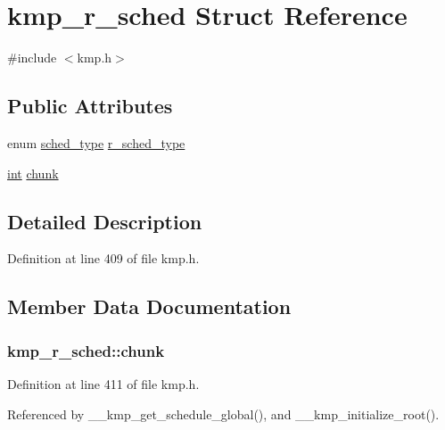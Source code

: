 \hypertarget{structkmp__r__sched}{\section{kmp\-\_\-r\-\_\-sched Struct Reference}
\label{structkmp__r__sched}
}


{\ttfamily \#include $<$kmp.\-h$>$}

\subsection*{Public Attributes}
\begin{DoxyCompactItemize}
\item 
enum \hyperlink{group__WORK__SHARING_gadcaf200537aaa0218a60c398438f81be}{sched\-\_\-type} \hyperlink{structkmp__r__sched_adc5935f3b0a5ef40ba9b9a019f815fc1}{r\-\_\-sched\-\_\-type}
\item 
\hyperlink{ittnotify__static_8h_a8b8dcd723308a8cb5d84277c7a3fff70}{int} \hyperlink{structkmp__r__sched_a22eae9ec8051de2d700b8991f33dead5}{chunk}
\end{DoxyCompactItemize}


\subsection{Detailed Description}


Definition at line 409 of file kmp.\-h.



\subsection{Member Data Documentation}
\hypertarget{structkmp__r__sched_a22eae9ec8051de2d700b8991f33dead5}{
\subsubsection[{chunk}]{ kmp\-\_\-r\-\_\-sched\-::chunk}}\label{structkmp__r__sched_a22eae9ec8051de2d700b8991f33dead5}


Definition at line 411 of file kmp.\-h.



Referenced by \-\_\-\-\_\-kmp\-\_\-get\-\_\-schedule\-\_\-global(), and \-\_\-\-\_\-kmp\-\_\-initialize\-\_\-root().

